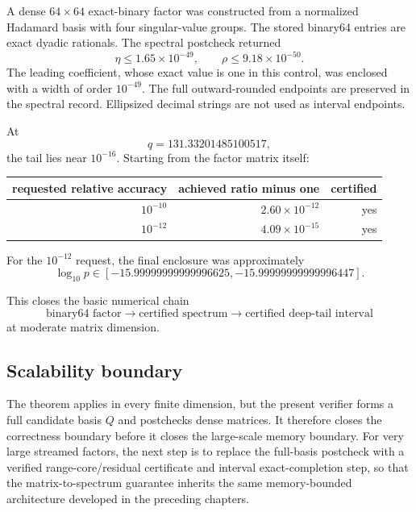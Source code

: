 A dense \(64\times64\) exact-binary factor was constructed from a normalized
Hadamard basis with four singular-value groups.  The stored binary64 entries
are exact dyadic rationals.  The spectral postcheck returned
\[
\eta\le1.65\times10^{-49},
\qquad
\rho\le9.18\times10^{-50}.
\]
The leading coefficient, whose exact value is one in this control,
was enclosed with a width of order $10^{-49}$. The full outward-rounded
endpoints are preserved in the spectral record. Ellipsized decimal strings
are not used as interval endpoints.

At
\[
q=131.33201485100517,
\]
the tail lies near \(10^{-16}\).  Starting from the factor matrix itself:

\begin{center}
\begin{tabular}{@{}rrr@{}}
\toprule
requested relative accuracy & achieved ratio minus one & certified\\
\midrule
$10^{-10}$ & $2.60\times10^{-12}$ & yes\\
$10^{-12}$ & $4.09\times10^{-15}$ & yes\\
\bottomrule
\end{tabular}
\end{center}

For the \(10^{-12}\) request, the final enclosure was approximately
\[
\log_{10}p
\in
[-15.99999999999996625,
 -15.99999999999996447].
\]

This closes the basic numerical chain
\[
\boxed{
\text{binary64 factor}
\longrightarrow
\text{certified spectrum}
\longrightarrow
\text{certified deep-tail interval}
}
\]
at moderate matrix dimension.

\subsection{Scalability boundary}

The theorem applies in every finite dimension, but the present verifier forms a full candidate
basis \(Q\) and postchecks dense matrices.  It therefore closes the correctness
boundary before it closes the large-scale memory boundary.  For very large
streamed factors, the next step is to replace the full-basis postcheck with a
verified range-core/residual certificate and interval exact-completion step,
so that the matrix-to-spectrum guarantee inherits the same memory-bounded
architecture developed in the preceding chapters.



